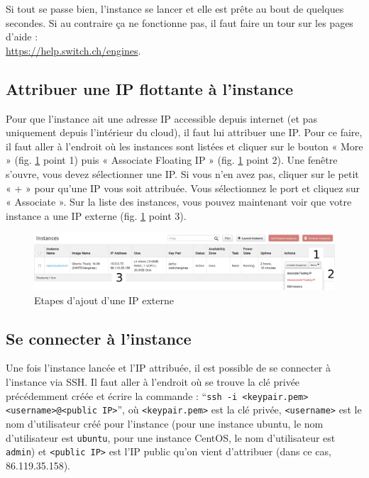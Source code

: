 Si tout se passe bien, l'instance se lancer et elle est prête au bout de quelques secondes. Si au contraire ça ne fonctionne pas, il faut faire un tour sur les pages d'aide : \\
\url{https://help.switch.ch/engines}.

\subsection{Attribuer une IP flottante à l'instance}

Pour que l'instance ait une adresse IP accessible depuis internet (et pas uniquement depuis l'intérieur du cloud), il faut lui attribuer une IP. Pour ce faire, il faut aller à l'endroit où les instances sont listées et cliquer sur le bouton « More » (fig. \ref{instanceIP} point 1) puis « Associate Floating IP » (fig. \ref{instanceIP} point 2). Une fenêtre s'ouvre, vous devez sélectionner une IP. Si vous n'en avez pas, cliquer sur le petit « + » pour qu'une IP vous soit attribuée. Vous sélectionnez le port et cliquez sur « Associate ». Sur la liste des instances, vous pouvez maintenant voir que votre instance a une IP externe (fig. \ref{instanceIP} point 3).

\begin{figure}[h]
  \centering
    \includegraphics[width=\linewidth]{img/instanceIP.png}
  \caption{Etapes d'ajout d'une IP externe}
  \label{instanceIP}
\end{figure}

\subsection{Se connecter à l'instance}

Une fois l'instance lancée et l'IP attribuée, il est possible de se connecter à l'instance via SSH. Il faut aller à l'endroit où se trouve la clé privée précédemment créée et écrire la commande : ``\texttt{ssh -i <keypair.pem> <username>@<public IP>}'', où \texttt{<keypair.pem>} est la clé privée, \texttt{<username>} est le nom d'utilisateur créé pour l'instance (pour une instance ubuntu, le nom d'utilisateur est \texttt{ubuntu}, pour une instance CentOS, le nom d'utilisateur est \texttt{admin}) et \texttt{<public IP>} est l'IP public qu'on vient d'attribuer (dans ce cas, 86.119.35.158). \\

